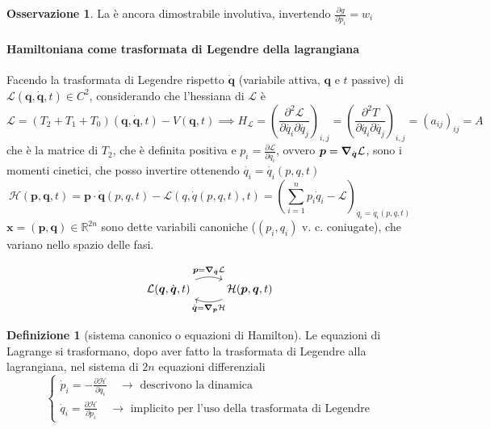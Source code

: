 \documentclass[a4paper,10pt]{article}
\theoremstyle{definition}
\newcommand{\bv}{\boldsymbol} %
\theoremstyle{indentdefinition}
\newtheorem{defn}{Definizione}[section]
\theoremstyle{indenttheorem}
\theoremstyle{myremark}
\newtheorem*{rem*}{Osservazione}
\theoremstyle{indentgeneral}
\begin{document}
\begin{rem*}
La  è ancora
dimostrabile involutiva, invertendo $\frac{\partial g}{\partial p_{i}}=w_{i}$
\end{rem*}

\paragraph{Hamiltoniana come trasformata di Legendre della lagrangiana} Facendo la trasformata di Legendre rispetto $\dot{\bv{q}}$ (variabile
attiva, $\bv{q}$ e $t$ passive) di $\mathcal{L}\left(\bv{q},\dot{\bv{q}},t\right)\in C^{2}$,
considerando che l'hessiana di $\mathcal{L}$ è 
$$\mathcal{L}=(T_2+T_1+T_0)(\bv{q},\dot{\bv{q}},t)-V(\bv{q},t)\implies H_{\mathcal{L}}=\left(\frac{\partial^{2}\mathcal{L}}{\partial\dot{q_{i}}\partial\dot{q_{j}}}\right)_{i,j}=\left(\frac{\partial^{2}T}{\partial\dot{q_{i}}\partial\dot{q_{j}}}\right)_{i,j}=(a_{ij})_{ij}=A$$
che è la matrice di $T_2$, che è definita positiva e $p_{i}=\frac{\partial\mathcal{L}}{\partial\dot{q_{i}}}$, ovvero $\bv{p}=\grad_{\dot{\bv{q}}}\mathcal{L}$,
sono i momenti cinetici, che posso invertire ottenendo $\dot{q_{i}}=\dot{q_{i}}\left(p,q,t\right)$
\[
\mathcal{H}\left(\bv{p},\bv{q},t\right)=\bv{p}\cdot\dot{\bv{q}}\left(p,q,t\right)-\mathcal{L}\left(q,\dot{q}\left(p,q,t\right),t\right)=\left(\sum_{i=1}^{n}p_{i}\dot{q}_{i}-\mathcal{L}\right)_{\dot{q}_{i}=\dot{q}_{i}\left(p,q,t\right)}
\]
$\bv{x}=\left(\bv{p},\bv{q}\right)\in\mathbb{R}^{2n}$ sono dette variabili canoniche
($\left(p_{i},q_{i}\right)$ v. c. coniugate), che variano nello spazio
delle fasi.

$$
\begin{tikzcd}
     \mathcal{L}(\bv{q},\dot{\bv{q}},t)\arrow[bend left=20]{r}{\bv{p}=\grad_{\dot{\bv{q}}}\mathcal{L}}
            &  \mathcal{H}(\bv{p},\bv{q},t) \arrow[bend left=20]{l}{\dot{\bv{q}}=\grad_{\bv{p}}\mathcal{H}} 
\end{tikzcd}
$$



\begin{defn}[sistema canonico o equazioni di Hamilton]
Le equazioni di Lagrange si trasformano, dopo aver fatto la trasformata di Legendre alla lagrangiana, nel sistema di $2n$ equazioni differenziali
\[
\begin{cases}
\dot{p}_{i}=-\frac{\partial\mathcal{H}}{\partial q_{i}} \quad\rightarrow\text{ descrivono la dinamica}\\
\dot{q}_{i}=\frac{\partial\mathcal{H}}{\partial p_{i}} \quad\rightarrow\text{ implicito per l'uso della trasformata di Legendre}
\end{cases}
\]
\end{defn}
\end{document}
